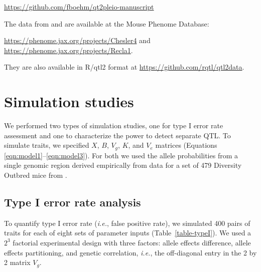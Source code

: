 \documentclass[oneside]{book}\usepackage[]{graphicx}\usepackage[]{color}
\begin{document}
\href{https://github.com/fboehm/qtl2pleio-manuscript}{https://github.com/fboehm/qt2pleio-manuscript}

\noindent The data from \citet{recla2014precise} and
\citet{logan2013high} are available at the Mouse Phenome Database:

\href{https://phenome.jax.org/projects/Chesler4}{https://phenome.jax.org/projects/Chesler4} and \href{https://phenome.jax.org/projects/Recla1}{https://phenome.jax.org/projects/Recla1}.

\noindent They are also available in R/qtl2 format at
\href{https://github.com/rqtl/qtl2data}{https://github.com/rqtl/qtl2data}.




\section{Simulation studies}

We performed two types of simulation studies, one for type I error
rate assessment and one to characterize the power to detect separate
QTL. To simulate traits, we specified $X$, $B$, $V_g$, $K$, and $V_e$
matrices (Equations \ref{eqn:model1}--\ref{eqn:model3}). For both we
used the allele probabilities from a single genomic region derived
empirically from data for a set of 479 Diversity Outbred mice from
\citet{keller2018genetic}.

\subsection{Type I error rate analysis}

To quantify type I error rate ({\em i.e.}, false positive rate), we
simulated 400 pairs of traits for each of eight sets of parameter
inputs (Table~\ref{table-typeI}). We used a $2^3$ factorial
experimental design with three factors: allele effects difference,
allele effects partitioning, and genetic correlation, \textit{i.e.},
the off-diagonal entry in the 2 by 2 matrix $V_g$.
\end{document}
